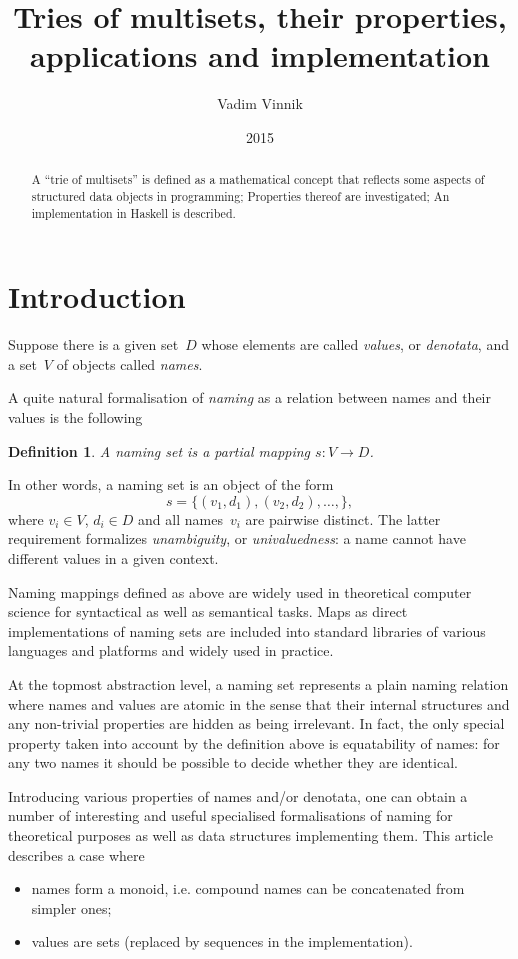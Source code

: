 \documentclass{article}
\title{Tries of multisets, their properties, applications and implementation}
\author{Vadim Vinnik}
\date{2015}
\newtheorem{Df}{Definition}
\begin{document}
\maketitle

\begin{abstract}
A ``trie of multisets'' is defined as a mathematical concept that
reflects some aspects of structured data objects in programming;
Properties thereof are investigated; An implementation in Haskell
is described.
\end{abstract}

\tableofcontents

\section{Introduction}

Suppose there is a given set~$D$ whose elements are called \emph{values}, or
\emph{denotata}, and a set~$V$ of objects called \emph{names}.

A quite natural formalisation of \emph{naming} as a relation between names and
their values is the following
\begin{Df}
A \emph{naming set} is a partial mapping $s: V\to D$.
\end{Df}

In other words, a naming set is an object of the form
\[
  s = \{ (v_1, d_1), (v_2, d_2), \ldots, \} ,
\]
where $v_i\in V$, $d_i\in D$ and all names~$v_i$ are pairwise distinct. The
latter requirement formalizes \emph{unambiguity}, or \emph{univaluedness}: a
name cannot have different values in a given context.

Naming mappings defined as above are widely used in theoretical computer
science for syntactical as well as semantical tasks. Maps as direct
implementations of naming sets are included into standard libraries of various
languages and platforms and widely used in practice.

At the topmost abstraction level, a naming set represents a plain naming
relation where names and values are atomic in the sense that their internal
structures and any non-trivial properties are hidden as being irrelevant. In
fact, the only special property taken into account by the definition above is
equatability of names: for any two names it should be possible to decide
whether they are identical.

Introducing various properties of names and/or denotata, one can obtain a
number of interesting and useful specialised formalisations of naming for
theoretical purposes as well as data structures implementing them.
This article describes a case where
\begin{itemize}
\item names form a monoid, i.e. compound names can be concatenated from
simpler ones;
\item values are sets (replaced by sequences in the implementation).
\end{itemize}
\end{document}

